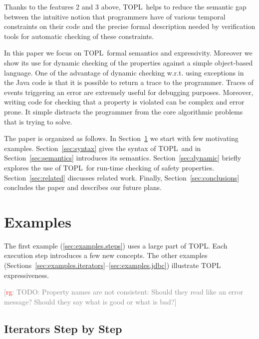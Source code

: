 \documentclass[preprint]{sigplanconf} %
\newcommand{\TPL}{TOPL}
\newcommand{\note}[2]{\textcolor{gray}{[\textcolor{red}{#1}: #2]}}
\newcommand{\rg}[1]{\note{rg}{#1}}
\theoremstyle{definition}
\theoremstyle{remark}
\begin{document}
Thanks to the features 2 and 3 above, \TPL \ helps to reduce the semantic gap between the intuitive notion that programmers have of various temporal constraints on their code and the precise formal description needed by verification tools for automatic 
checking of these constraints.

In this paper we focus on \TPL \ formal semantics and expressivity.
Moreover we show its use for dynamic checking of the properties against  a simple object-based language.
One of the advantage of dynamic checking w.r.t. using exceptions in the Java code is that it is possible to return a trace to the programmer.
Traces of events triggering an error are extremely useful for debugging purposes.
Moreover, writing code for checking that a property is violated can be complex and error prone. It simple distracts the programmer from the core algorithmic problems that is trying to solve.


The paper is organized as follows. In Section~\ref{sec:examples} we start with few motivating examples.
Section~\ref{sec:syntax} gives the syntax of \TPL \ and in Section~\ref{sec:semantics} introduces its semantics.
Section~\ref{sec:dynamic} briefly explores the use of \TPL \ for run-time checking of safety properties.
Section~\ref{sec:related} discusses related work.
Finally, Section~\ref{sec:conclusions} concludes the paper
and describes our future plans.

\section{Examples} \label{sec:examples} %

The first example (\autoref{sec:examples.steps}) uses a large part of \TPL\null.
Each execution step introduces a few new concepts.
The other examples (Sections~\ref*{sec:examples.iterators}--\ref*{sec:examples.jdbc}) illustrate TOPL expressiveness.

\rg{TODO: Property names are not consistent:
Should they read like an error message?
Should they say what is good or what is bad?}

\subsection{Iterators Step by Step} \label{sec:examples.steps} %
\end{document}
